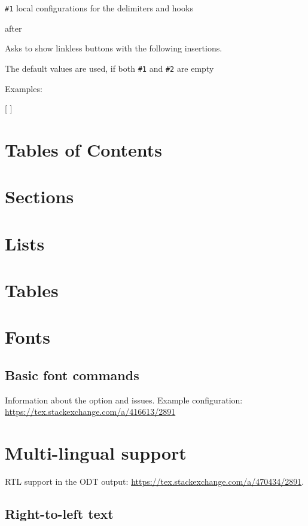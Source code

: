 \documentclass{book}
\begin{document}
  \verb|#1| local configurations for the delimiters and hooks

 {after}\EndDoc

Asks to show linkless buttons with the following insertions.

The default values are used, if both \verb|#1| and \verb|#2| are empty

   Examples:

\begin{texsource}

    {[}
    {] }
\end{texsource}

\section{Tables of Contents}

\section{Sections}
\section{Lists}
\section{Tables}

\section{Fonts}
\subsection{Basic font commands}

Information about the  option and  issues. 
Example configuration:
\url{https://tex.stackexchange.com/a/416613/2891}

\section{Multi-lingual support}

RTL support in the ODT output: \url{https://tex.stackexchange.com/a/470434/2891}.

\subsection{Right-to-left text}
\end{document}

